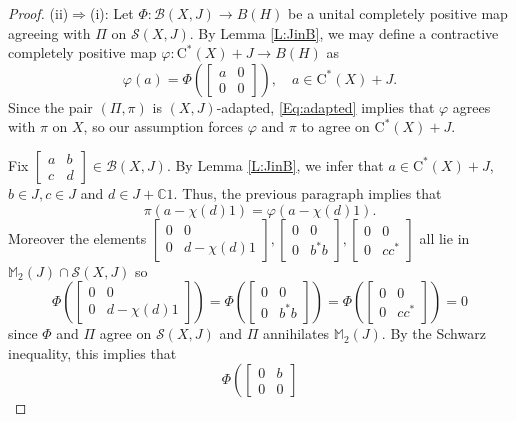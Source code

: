\documentclass[10pt,a4paper]{amsart}
\newcommand{\B}{{\mathcal{B}}}
\newcommand{\bC}{{\mathbb{C}}}
\newcommand{\bM}{{\mathbb{M}}}
\newcommand{\rC}{\mathrm{C}}
\renewcommand{\S}{{\mathcal{S}}}
\renewcommand{\phi}{\varphi}
\begin{document}
\begin{proof}
(ii)$\Rightarrow$(i): Let $\Phi:\B(X,J)\to B(H)$ be a unital completely positive map agreeing with $\Pi$ on $\S(X,J)$.
By Lemma \ref{L:JinB}, we may define a contractive completely positive map $\phi:\rC^*(X)+J\to B(H)$ as
\[
\phi(a)=\Phi\left(\begin{bmatrix}
a& 0 \\ 0 & 0
\end{bmatrix}\right), \quad a\in \rC^*(X)+J.
\]
Since the pair $(\Pi,\pi)$ is $(X,J)$-adapted,  \eqref{Eq:adapted} implies that $\phi$ agrees with $\pi$ on $X$, so our assumption forces $\phi$ and $\pi$ to agree on $\rC^*(X)+J$.



 Fix $\begin{bmatrix}
a & b \\ c& d
\end{bmatrix}\in \B(X,J)$. By Lemma \ref{L:JinB}, we infer that $a\in \rC^*(X)+J$, $b\in J,c\in J$ and $d\in J+\bC 1$. Thus, the previous paragraph implies that
\begin{equation}\label{Eq:piphia}
\pi(a-\chi(d)1)=\phi(a-\chi(d)1).
\end{equation}
Moreover the elements
$\begin{bmatrix}
0& 0 \\ 0 & d-\chi(d)1
\end{bmatrix},\begin{bmatrix}
0 & 0 \\ 0 & b^*b
\end{bmatrix},\begin{bmatrix}
0 & 0 \\ 0 & cc^*
\end{bmatrix}$ all lie in $ \bM_2(J)\cap \S(X,J)$
so
\[
\Phi\left(\begin{bmatrix}
0 & 0 \\  0& d-\chi(d)1
\end{bmatrix}\right)=\Phi\left(\begin{bmatrix}
0 & 0 \\ 0 & b^*b
\end{bmatrix} \right)=\Phi\left(\begin{bmatrix}
0 & 0 \\ 0 & cc^*
\end{bmatrix} \right)=0
\]
since  $\Phi$ and $\Pi$ agree on $\S(X,J)$ and $\Pi$  annihilates $\bM_2(J)$.
By the Schwarz inequality, this implies that
\[
\Phi\left(\begin{bmatrix}
0& b \\ 0& 0

\end{bmatrix}\]
\end{proof}
\end{document}
